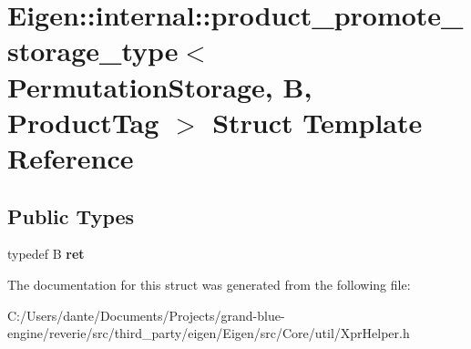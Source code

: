 \hypertarget{struct_eigen_1_1internal_1_1product__promote__storage__type_3_01_permutation_storage_00_01_b_00_01_product_tag_01_4}{}\section{Eigen\+::internal\+::product\+\_\+promote\+\_\+storage\+\_\+type$<$ Permutation\+Storage, B, Product\+Tag $>$ Struct Template Reference}
\label{struct_eigen_1_1internal_1_1product__promote__storage__type_3_01_permutation_storage_00_01_b_00_01_product_tag_01_4}
\subsection*{Public Types}
\begin{DoxyCompactItemize}
\item 
\mbox{\label{struct_eigen_1_1internal_1_1product__promote__storage__type_3_01_permutation_storage_00_01_b_00_01_product_tag_01_4_a8904801ab2506a7e86cd2c7daf10c051}} 
typedef B {\bfseries ret}
\end{DoxyCompactItemize}


The documentation for this struct was generated from the following file\+:\begin{DoxyCompactItemize}
\item 
C\+:/\+Users/dante/\+Documents/\+Projects/grand-\/blue-\/engine/reverie/src/third\+\_\+party/eigen/\+Eigen/src/\+Core/util/Xpr\+Helper.\+h\end{DoxyCompactItemize}
